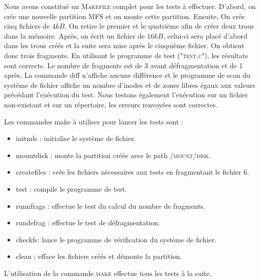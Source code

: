 Nous avons constitué un \textsc{Makefile} complet pour les tests à effectuer. D'abord, on crée une nouvelle partition \textsc{MFS} et on monte cette partition. Ensuite, On crée cinq fichiers de $4kB$. On retire le premier et le quatrième afin de créer deux trous dans la mémoire. Après, on écrit un fichier de $16kB$, celui-ci sera placé d'abord dans les trous créés et la suite sera mise après le cinquième fichier. On obtient donc trois fragments. En utilisant le programme de test ("\textsc{test.c}"), les résultats sont corrects. Le nombre de fragments est de 3 avant défragmentation et de 1 après. La commande diff n'affiche aucune différence et le programme de scan du système de fichier affiche un nombre d'inodes et de zones libres égaux aux valeurs précédant l'exécution du test. Nous testons également l'exécution sur un fichier non-existant et sur un répertoire, les erreurs renvoyées sont correctes.

Les commandes make à utiliser pour lancer les tests sont :
\begin{itemize}
\item initmfs : initialise le système de fichier.
\item mountdisk : monte la partition créée avec le path \textsc{/mount/disk}.
\item createfiles : crée les fichiers nécessaires aux tests en fragmentant le fichier 6.
\item test : compile le programme de test.
\item runnfrags : effectue le test du calcul du nombre de fragments.
\item rundefrag : effectue le test de défragmentation.
\item checkfs: lance le programme de vérification du système de fichier.
\item clean : efface les fichiers créés et démonte la partition.
\end{itemize}
L'utilisation de la commande \textsc{make} effectue tous les tests à la suite.